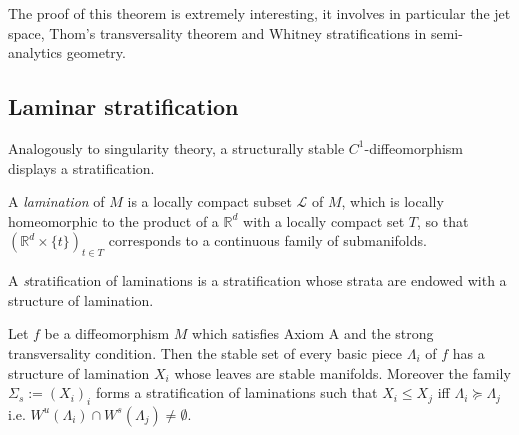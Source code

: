 \documentclass[11pt,openany,leqno]{article}
\begin{document}
The proof of this theorem is extremely interesting, it involves in particular the jet space, Thom's transversality theorem and Whitney stratifications in semi-analytics geometry. %



\subsection{Laminar stratification}
Analogously to singularity theory, a structurally stable $C^1$-diffeomorphism displays a stratification. 
\begin{defi}
 A \emph  {lamination} of $M$ is a locally compact subset $\mathcal L$ of $M$, which is locally homeomorphic to the product of a $\mathbb R^d$ with a locally compact set $T$, so that $(\mathbb R^d \times \{t\})_{t\in T}$ corresponds to a continuous family of submanifolds.
\end{defi}

\begin{defi} A {\emph stratification of laminations} is a stratification  whose strata are endowed with a structure of  lamination.\end{defi}


\begin{prop}
Let $f$ be a diffeomorphism  $M$ which satisfies Axiom A and the strong transversality condition. Then the stable set of every basic piece $\Lambda_i$ of $f$ has a structure of lamination $X_i$ whose leaves are stable manifolds. Moreover the family $\Sigma_s:= (X_i)_i$ forms a stratification of laminations such that  $X_i\le X_j$ iff $\Lambda_i \succeq \Lambda_j$ i.e. $W^u(\Lambda_i)\cap W^s(\Lambda_j)\not = \emptyset$.\end{prop} 
\end{document}
